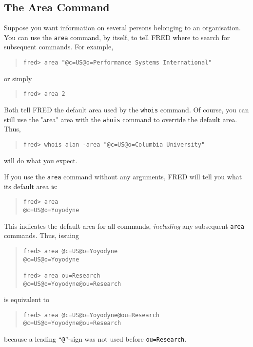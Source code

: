 \subsection	{The Area Command}
Suppose
you want information on several persons belonging to an organisation.
You can use the \verb"area" command,
by itself,
to tell FRED where to search for subsequent commands.
For example,
\begin{quote}\small\begin{verbatim}
fred> area "@c=US@o=Performance Systems International"
\end{verbatim}\end{quote}
or simply
\begin{quote}\small\begin{verbatim}
fred> area 2
\end{verbatim}\end{quote}
Both tell FRED the default area used by the \verb"whois" command.
Of course,
you can still use the \switch"area" area with the \verb"whois" command to
override the default area.
Thus,
\begin{quote}\small\begin{verbatim}
fred> whois alan -area "@c=US@o=Columbia University"
\end{verbatim}\end{quote}
will do what you expect.

If you use the \verb"area" command without any arguments,
FRED will tell you what its default area is:
\begin{quote}\small\begin{verbatim}
fred> area
@c=US@o=Yoyodyne
\end{verbatim}\end{quote}
This indicates the default area for all commands,
{\em including\/} any subsequent \verb"area" commands.
Thus, issuing

\begin{quote}\small\begin{verbatim}
fred> area @c=US@o=Yoyodyne
@c=US@o=Yoyodyne

fred> area ou=Research
@c=US@o=Yoyodyne@ou=Research
\end{verbatim}\end{quote}
is equivalent to
\begin{quote}\small\begin{verbatim}
fred> area @c=US@o=Yoyodyne@ou=Research
@c=US@o=Yoyodyne@ou=Research
\end{verbatim}\end{quote}
because a leading ``\verb"@"''-sign was not used before \verb"ou=Research".


